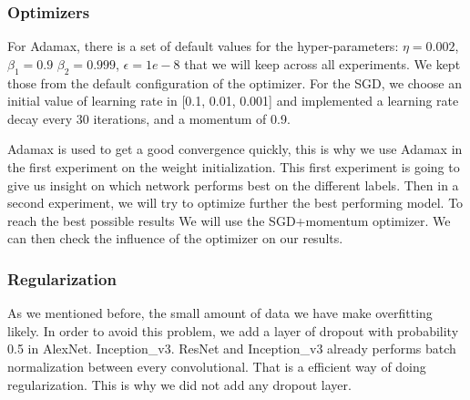 \subsubsection{Optimizers}
For Adamax, there is a set of default values for the hyper-parameters: \(\eta = 0.002\), \(\beta_1 = 0.9\) \(\beta_2 = 0.999\), \(\epsilon = 1e-8\) that we will keep across all experiments. We kept those from the default configuration of the optimizer. 
For the SGD, we choose an initial value of learning rate in [0.1, 0.01, 0.001] and implemented a learning rate decay every 30 iterations, and a momentum of 0.9. 

Adamax is used to get a good convergence quickly, this is why we use Adamax in the first experiment on the weight initialization. This first experiment is going to give us insight on which network performs best on the different labels. Then in a second experiment, we will try to optimize further the best performing model. To reach the best possible results We will use the SGD+momentum optimizer. We can then check the influence of the optimizer on our results. 

\subsubsection{Regularization}
As we mentioned before, the small amount of data we have make overfitting likely. In order to avoid this problem, we add a layer of dropout with probability 0.5 in AlexNet. Inception\_v3. ResNet and Inception\_v3 already performs batch normalization between every convolutional. That is a efficient way of doing regularization. This is why we did not add any dropout layer.  